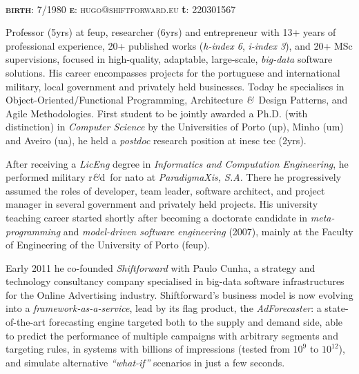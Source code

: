 \documentclass[9pt, a4paper]{article}
\newcommand{\amper}{{\fontspec[Scale=.95]{Hoefler Text}\selectfont\itshape\&}}
\newcommand{\marginimage}{
}
\newcommand{\acr}[1]{{\sc #1}}
\newcommand{\rnd}{{\sc r\amper d}~}
\begin{document}

{\huge\sc{}}\\
{\small {\scshape  {\bfseries birth}: 7/1980 \hspace{7.5mm} {\bfseries e}: hugo@shiftforward.eu} \hspace{7mm} {\bfseries t}: 220301567}\\

\marginimage{\small Professor (5yrs) at {\sc feup}, researcher (6yrs) and entrepreneur with 13+ years of professional experience, 20+ published works (\emph{h-index 6}, \emph{i-index 3}), and 20+ MSc supervisions, focused in high-quality, adaptable, large-scale, \emph{big-data} software solutions. His career encompasses projects for the portuguese and international military, local government and privately held businesses. Today he specialises in Object-Oriented/Functional Programming, Architecture \amper~Design Patterns, and Agile Methodologies. First student to be jointly awarded a Ph.D. (with distinction) in \emph{Computer Science} by the Universities of Porto {\sc (up)}, Minho {\sc (um)} and Aveiro {\sc (ua)}, he held a \emph{postdoc} research position at \acr{inesc tec} (2yrs).

\vspace{1mm}After receiving a \emph{LicEng} degree in \emph{Informatics and Computation Engineering}, he performed military \rnd for \acr{nato} at \emph{ParadigmaXis, S.A.} There he progressively assumed the roles of developer, team leader, software architect, and project manager in several government and privately held projects. His university teaching career started shortly after becoming a doctorate candidate in \emph{meta-programming} and \emph{model-driven software engineering} (2007), mainly at the Faculty of Engineering of the University of Porto (\acr{feup}).

\vspace{1mm}Early 2011 he co-founded \emph{Shiftforward} with Paulo Cunha, a strategy and technology consultancy company specialised in big-data software infrastructures for the Online Advertising industry. Shiftforward's business model is now evolving into a \emph{framework-as-a-service}, lead by its flag product, the \emph{AdForecaster}: a state-of-the-art forecasting engine targeted both to the supply and demand side, able to predict the performance of multiple campaigns with arbitrary segments and targeting rules, in systems with billions of impressions (tested from $10^9$ to $10^{12}$), and simulate alternative \emph{``what-if''} scenarios in just a few seconds.}
\end{document}
